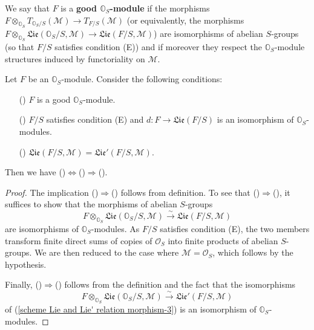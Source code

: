 \begin{definition}
We say that $F$ is a \textbf{good $\mathbb{O}_S$-module} if the morphisms $F\otimes_{\mathbb{O}_S}T_{\mathbb{O}_S/S}(\mathscr{M})\to T_{F/S}(\mathscr{M})$ (or equivalently, the morphisms $F\otimes_{\mathbb{O}_S}\mathfrak{Lie}(\mathbb{O}_S/S,\mathscr{M})\to \mathfrak{Lie}(F/S,\mathscr{M})$) are isomorphisms of abelian $S$-groups (so that $F/S$ satisfies condition (E)) and if moreover they respect the $\mathbb{O}_S$-module structures induced by functoriality on $\mathscr{M}$.
\end{definition}

\begin{proposition}\label{scheme O_S-module good Lie and Lie' coincide}
Let $F$ be an $\mathbb{O}_S$-module. Consider the following conditions:
\begin{enumerate}
    \item[(\rmnum{1})] $F$ is a good $\mathbb{O}_S$-module.
    \item[(\rmnum{2})] $F/S$ satisfies condition (E) and $d:F\to\mathfrak{Lie}(F/S)$ is an isomorphism of $\mathbb{O}_S$-modules.
    \item[(\rmnum{3})] $\mathfrak{Lie}(F/S,\mathscr{M})=\mathfrak{Lie}'(F/S,\mathscr{M})$.
\end{enumerate}
Then we have ()$\Leftrightarrow$()$\Rightarrow$().
\end{proposition}
\begin{proof}
The implication ()$\Rightarrow$() follows from definition. To see that ()$\Rightarrow$(), it suffices to show that the morphisms of abelian $S$-groups
\[F\otimes_{\mathbb{O}_S}\mathfrak{Lie}(\mathbb{O}_S/S,\mathscr{M})\stackrel{\sim}{\to} \mathfrak{Lie}(F/S,\mathscr{M})\]
are isomorphisms of $\mathbb{O}_S$-modules. As $F/S$ satisfies condition (E), the two members transform finite direct sums of copies of $\mathscr{O}_S$ into finite products of abelian $S$-groups. We are then reduced to the case where $\mathscr{M}=\mathscr{O}_S$, which follows by the hypothesis.\par
Finally, ()$\Rightarrow$() follows from the definition and the fact that the isomorphisms
\[F\otimes_{\mathbb{O}_S}\mathfrak{Lie}(\mathbb{O}_S/S,\mathscr{M})\stackrel{\sim}{\to}\mathfrak{Lie}'(F/S,\mathscr{M})\]
of (\ref{scheme Lie and Lie' relation morphism-3}) is an isomorphism of $\mathbb{O}_S$-modules.
\end{proof}

